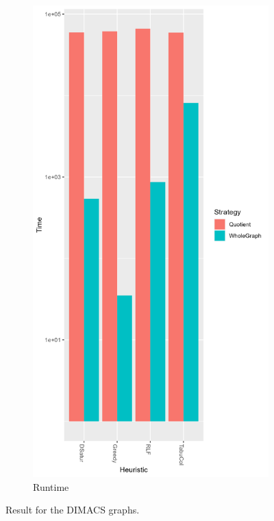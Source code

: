\documentclass[a4paper]{article}
\begin{document}
\begin{figure}[p]
\begin{subfigure}{.4\paperwidth}
    \end{subfigure}%
    \begin{subfigure}{.4\paperwidth}
        \includegraphics[width=\columnwidth]{Tables/DIMACSTime.png}
      \caption{Runtime}
      \label{fig:dimacst}
    \end{subfigure}
\caption{Result for the DIMACS graphs. \figdesc}
\label{fig:dimacs}
\end{figure}
\end{document}
